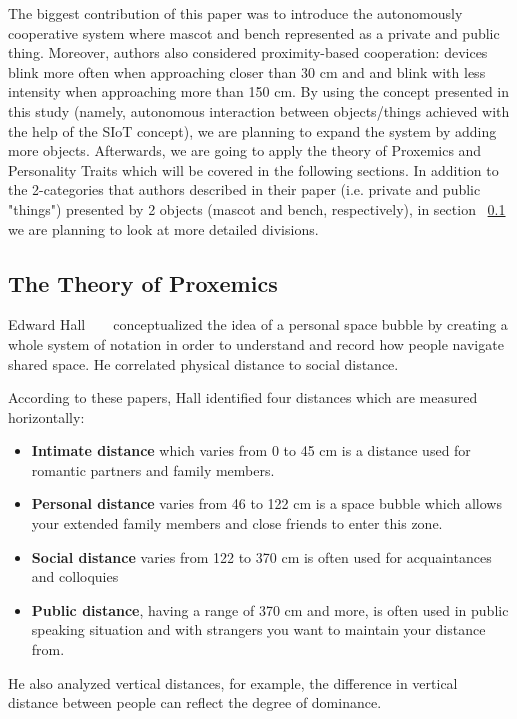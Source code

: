 The biggest contribution of this paper was to introduce the autonomously cooperative system where mascot and bench represented as a private and public thing. Moreover, authors also considered proximity-based cooperation: devices blink more often when approaching closer than 30 cm and and blink with less intensity when approaching more than 150 cm. By using the concept presented in this study (namely, autonomous interaction between objects/things achieved with the help of the SIoT concept), we are planning to expand the system by adding more objects. Afterwards, we are going to apply the theory of Proxemics and Personality Traits which will be covered in the following sections. In addition to the 2-categories that authors described in their paper (i.e. private and public "things") presented by 2 objects (mascot and bench, respectively), in section ~\ref{sec:The Theory of Proxemics} we are planning to look at more detailed divisions.

\subsection{The Theory of Proxemics}
\label{sec:The Theory of Proxemics}
Edward Hall ~\cite{hall1963system} ~\cite{hall1910hidden} conceptualized the idea of a personal space bubble by creating a whole system of notation in order to understand and record how people navigate shared space. He correlated physical distance to social distance.

According to these papers, Hall identified four distances which are measured horizontally:
\begin{itemize}
  \item \textbf{Intimate distance} which varies from 0 to 45 cm is a distance used for romantic partners and family members.
  \item \textbf{Personal distance} varies from 46 to 122 cm is a space bubble which allows your extended family members and close friends to enter this zone.
  \item \textbf{Social distance} varies from 122 to 370 cm is often used for acquaintances and colloquies
  \item \textbf{Public distance}, having a range of 370 cm and more, is often used in public speaking situation and with strangers you want to maintain your distance from.
\end{itemize}

He also analyzed vertical distances, for example, the difference in vertical distance between people can reflect the degree of dominance.

